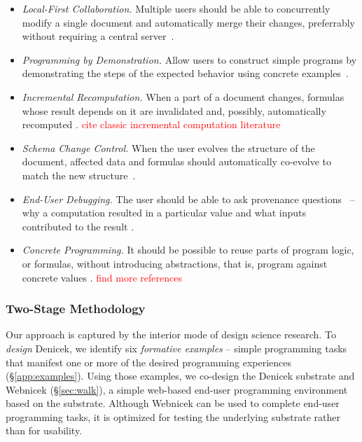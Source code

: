 \documentclass[sigconf,anonymous,screen]{acmart}
\newcommand{\note}[1]{\textcolor{red}{#1}}
\begin{document}
\begin{itemize}
\item \emph{Local-First Collaboration.} Multiple users should be able to concurrently
  modify a single document and automatically merge their changes, preferrably without requiring a central server~\cite{kleppmann-2019-local,litt-2022-peritext}.
\item \emph{Programming by Demonstration.} Allow users to construct simple programs by
  demonstrating the steps of the expected behavior using concrete examples~\cite{leiva-2021-rapido,cypher-1993-pbd}.
\item \emph{Incremental Recomputation.} When a part of a document changes, formulas whose result
  depends on it are invalidated and, possibly, automatically recomputed \cite{mcdirmid-2013-usable,horowitz-2023-engraft,petricek-2020-live}.
  \note{cite classic incremental computation literature}
\item \emph{Schema Change Control.} When the user evolves the structure of the document, affected
  data and formulas should automatically co-evolve to match the new structure~\cite{litt-2020-cambria,edwards-2025-schema}.
\item \emph{End-User Debugging.} The user should be able to ask provenance questions~\cite{cheney-2009-provenance} --
  why a computation resulted in a particular value and what inputs contributed to the result \cite{ko-2009-whyline}.
\item \emph{Concrete Programming.} It should be possible to reuse parts of program logic, or formulas,
  without introducing abstractions, that is, program against concrete values \cite{edwards-2006-copypaste,edwards-2022-copypaste}. \note{find more references}
\end{itemize}

\subsubsection*{Two-Stage Methodology}
Our approach is captured by the interior mode \cite{adam-2021-dsr} of design science research.
To \emph{design} Denicek, we identify six \emph{formative examples} -- simple programming
tasks that manifest one or more of the desired programming experiences (\S\ref{app:examples}).
Using those examples, we co-design the Denicek substrate and Webnicek (\S\ref{sec:walk}),
a simple web-based end-user programming environment based on the substrate. Although Webnicek can
be used to complete end-user programming tasks, it is optimized for testing the underlying
substrate rather than for usability.
\end{document}
